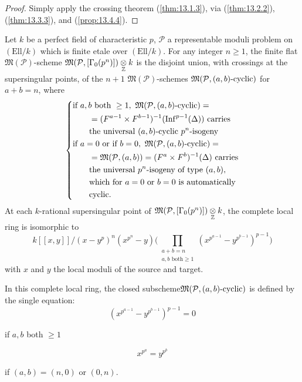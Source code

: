 \begin{proof}
Simply apply the crossing theorem (\ref{thm:13.1.3}), via (\ref{thm:13.2.2}), (\ref{thm:13.3.3}), and (\ref{prop:13.4.4}).
\end{proof}

\begin{kthm}\label{thm:13.4.7}
Let $k$ be a perfect field of characteristic $p$, $\mathcal{P}$ a representable moduli problem on $(\mathrm{Ell}/k)$ which is finite etale over $(\mathrm{Ell}/k)$. For any integer $n \ge 1$, the finite flat $\mathfrak{M}(\mathcal{P})$-scheme $\mathfrak{M}(\mathcal{P}, [\Gamma_0(p^n)]) \underset{\mathbb{Z}}{\otimes} k$ is the disjoint union, with crossings at the supersingular points, of the $n+1$ $\mathfrak{M}(\mathcal{P})$-schemes $\mathfrak{M}(\mathcal{P}, (a,b)\text{-\rm cyclic})$ for $a+b = n$, where
\[
\left\{
\begin{aligned}
&\text{if } a, b \text{ both } \ge 1 , \ \mathfrak{M}(\mathcal{P}, (a,b)\text{-\rm cyclic}) = \\
&\qquad = (F^{a-1} \times F^{b-1})^{-1}(\mathrm{Inf}^{p-1}(\Delta)) \ \text{carries} \\
&\qquad \text{the universal } (a,b)\text{-cyclic } p^n\text{-isogeny} \\
&\text{if } a = 0 \text{ or if } b = 0 , \ \mathfrak{M}(\mathcal{P}, (a,b)\text{-\rm cyclic}) = \\
&\qquad = \mathfrak{M}(\mathcal{P}, (a,b)) = (F^a \times F^b)^{-1}(\Delta) \ \text{carries} \\
&\qquad \text{the universal } p^n\text{-isogeny of type } (a,b), \\
&\qquad \text{which for } a = 0 \text{ or } b = 0 \text{ is automatically} \\
&\qquad \text{cyclic.}
\end{aligned}
\right.
\]
At each $k$-rational supersingular point of $\mathfrak{M}(\mathcal{P}, [\Gamma_0(p^n)]) \underset{\mathbb{Z}}{\otimes} k$, the complete local ring is isomorphic to
\[
k[[x, y]] \Big/ (x - y^p)^n (x^{p^n} - y) \biggl( \prod_{\substack{a+b=n \\ a, b \text{ both} \ge 1}} (x^{p^{a-1}} - y^{p^{b-1}})^{p-1} \biggr)
\]
with $x$ and $y$ the local moduli of the source and target.

In this complete local ring, the closed subscheme\linebreak $\mathfrak{M}(\mathcal{P}, (a,b)\text{-\rm cyclic})$ is defined by the single equation:
\[
(x^{p^{a-1}} - y^{p^{b-1}})^{p-1} = 0
\]
\begin{center}
if $a, b$ both $\ge 1$
\end{center}
\[
x^{p^a} = y^{p^b}
\]
\begin{center}
if $(a,b) = (n,0)$ or $(0,n)$.
\end{center}
\end{kthm}

